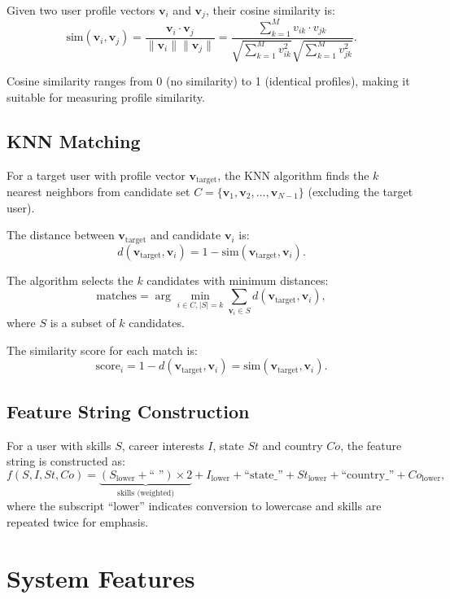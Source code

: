 \documentclass[12pt,a4paper]{report}
\let\origsection\section
\renewcommand{\section}{\needspace{4\baselineskip}\origsection}
\let\origsubsection\subsection
\renewcommand{\subsection}{\needspace{4\baselineskip}\origsubsection}
\begin{document}
Given two user profile vectors $\mathbf{v}_i$ and $\mathbf{v}_j$, their cosine similarity is:
\[
\text{sim}(\mathbf{v}_i, \mathbf{v}_j) = \frac{\mathbf{v}_i \cdot \mathbf{v}_j}{\|\mathbf{v}_i\| \|\mathbf{v}_j\|} = \frac{\sum_{k=1}^{M} v_{ik} \cdot v_{jk}}{\sqrt{\sum_{k=1}^{M} v_{ik}^2} \sqrt{\sum_{k=1}^{M} v_{jk}^2}}.
\]

Cosine similarity ranges from 0 (no similarity) to 1 (identical profiles), making it suitable for measuring profile similarity.

\subsection{KNN Matching}

For a target user with profile vector $\mathbf{v}_{\text{target}}$, the KNN algorithm finds the $k$ nearest neighbors from candidate set $C = \{\mathbf{v}_1, \mathbf{v}_2, \ldots, \mathbf{v}_{N-1}\}$ (excluding the target user).

\medskip

\noindent
The distance between $\mathbf{v}_{\text{target}}$ and candidate $\mathbf{v}_i$ is:
\[
d(\mathbf{v}_{\text{target}}, \mathbf{v}_i) = 1 - \text{sim}(\mathbf{v}_{\text{target}}, \mathbf{v}_i).
\]

\noindent
The algorithm selects the $k$ candidates with minimum distances:
\[
\text{matches} = \arg\min_{i \in C, |S|=k} \sum_{\mathbf{v}_i \in S} d(\mathbf{v}_{\text{target}}, \mathbf{v}_i),
\]
where $S$ is a subset of $k$ candidates.

\noindent
The similarity score for each match is:
\[
\text{score}_i = 1 - d(\mathbf{v}_{\text{target}}, \mathbf{v}_i) = \text{sim}(\mathbf{v}_{\text{target}}, \mathbf{v}_i).
\]

\subsection{Feature String Construction}

For a user with skills $S$, career interests $I$, state $St$ and country $Co$, the feature string is constructed as:
\[
f(S, I, St, Co) = \underbrace{(S_{\text{lower}} + \text{`` ''}) \times 2}_{\text{skills (weighted)}} + I_{\text{lower}} + \text{``state\_''} + St_{\text{lower}} + \text{``country\_''} + Co_{\text{lower}},
\]
where the subscript ``lower'' indicates conversion to lowercase and skills are repeated twice for emphasis.

\section{System Features}
\end{document}
